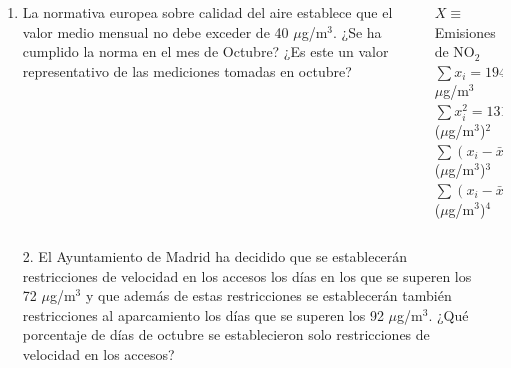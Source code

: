 \documentclass[aspectratio=149,10pt,t]{beamer}
\begin{document}
\begin{frame}
	\begin{columns}
		\begin{column}[T]{0.55\textwidth}
			\begin{enumerate}
				\item La normativa europea sobre calidad del aire establece que el valor medio mensual no debe exceder de 40 $\mu$g/m$^3$. ¿Se ha cumplido la norma en el mes de Octubre? 
				¿Es este un valor representativo de las mediciones tomadas en octubre?		
			\end{enumerate}
		\end{column}
		\begin{column}[T]{0.45\textwidth}
			\begin{datos}
				$X\equiv$ Emisiones de NO$_2$\\
				$\sum x_i=1945$ $\mu$g/m$^3$\\
				$\sum x_i^2=131575$ ($\mu$g/m$^3$)$^2$\\
				$\sum (x_i-\bar x)^3=93995.838$ ($\mu$g/m$^3$)$^3$\\
				$\sum (x_i-\bar x)^4=7766271.021$ ($\mu$g/m$^3$)$^4$
			\end{datos}
		\end{column}
	\end{columns}
\end{frame}


\begin{frame}
	\begin{columns}
		\begin{column}[T]{0.55\textwidth}
			\begin{enumerate}
				\item[2.] El Ayuntamiento de Madrid ha decidido que se establecerán restricciones de velocidad en los accesos los días en los que se superen los 72 $\mu$g/m$^3$ y que además de estas restricciones se establecerán también restricciones al aparcamiento los días que se superen los 92 $\mu$g/m$^3$.
		¿Qué porcentaje de días de octubre se establecieron solo restricciones de velocidad en los accesos?
			\end{enumerate}
		\end{column}
		\begin{column}[T]{0.45\textwidth}
			\begin{datos}
				\resizebox{\textwidth}{!}{}
			\end{datos}
		\end{column}
	\end{columns}
\end{frame}
\end{document}
